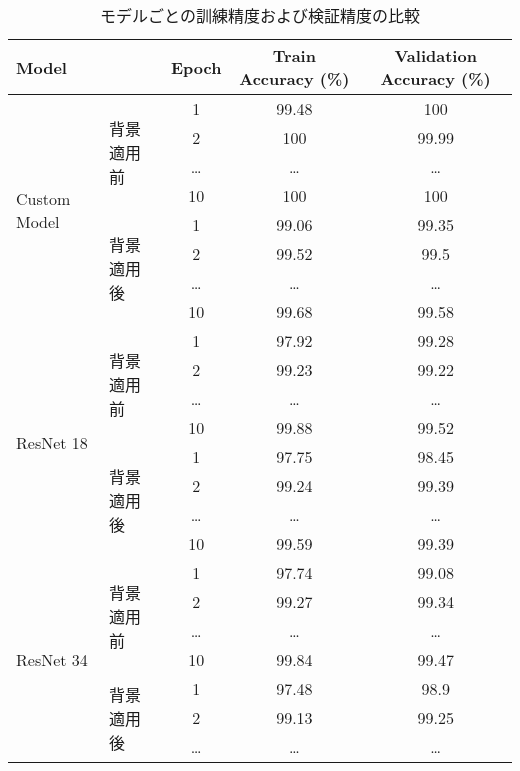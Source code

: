 \documentclass[a4paper,11pt,titlepage]{jsarticle}
\begin{document}
\begin{table}[htbp]
    \centering
    \caption{モデルごとの訓練精度および検証精度の比較}
    \label{tab:model_performance}
    \begin{tabular}{|l|l|c|c|c|}
        \hline
        \textbf{Model} & \textbf{} & \textbf{Epoch} & \textbf{Train Accuracy (\%)} & \textbf{Validation Accuracy (\%)} \\
        \hline
        \multirow{8}{*}{Custom Model} & \multirow{4}{*}{背景適用前} & 1 & 99.48 & 100 \\
        & & 2 & 100 & 99.99 \\
        & & \dots & \dots & \dots \\
        & & 10 & 100& 100 \\ %
        \cline{2-5}
        & \multirow{4}{*}{背景適用後} & 1 & 99.06 & 99.35 \\
        & & 2 & 99.52 & 99.5 \\
        & & \dots & \dots & \dots \\
        & & 10 & 99.68 & 99.58 \\ %
        \hline
        \multirow{8}{*}{ResNet 18} & \multirow{4}{*}{背景適用前} & 1 & 97.92 & 99.28 \\
        & & 2 & 99.23 & 99.22 \\
        & & \dots & \dots & \dots \\
        & & 10 & 99.88 & 99.52 \\ %
        \cline{2-5}
        & \multirow{4}{*}{背景適用後} & 1 & 97.75 & 98.45 \\
        & & 2 & 99.24 & 99.39 \\
        & & \dots & \dots & \dots \\
        & & 10 & 99.59 & 99.39 \\ %
        \hline
        \multirow{8}{*}{ResNet 34} & \multirow{4}{*}{背景適用前} & 1 & 97.74 & 99.08 \\
        & & 2 & 99.27 & 99.34 \\
        & & \dots & \dots & \dots \\
        & & 10 & 99.84 & 99.47 \\ %
        \cline{2-5}
        & \multirow{4}{*}{背景適用後} & 1 & 97.48 & 98.9 \\
        & & 2 & 99.13 & 99.25 \\
        & & \dots & \dots & \dots \\

\end{tabular}
\end{table}
\end{document}
